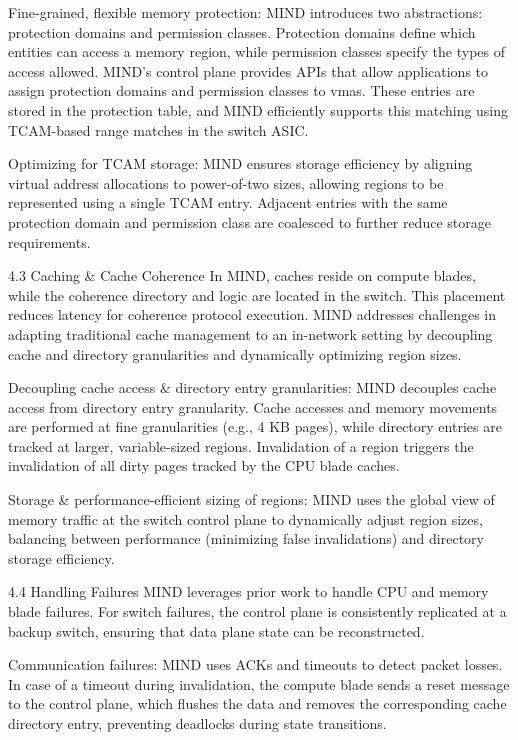 Fine-grained, flexible memory protection: MIND introduces two abstractions: protection domains and permission classes. Protection domains define which entities can access a memory region, while permission classes specify the types of access allowed. MIND’s control plane provides APIs that allow applications to assign protection domains and permission classes to vmas. These entries are stored in the protection table, and MIND efficiently supports this matching using TCAM-based range matches in the switch ASIC.

Optimizing for TCAM storage: MIND ensures storage efficiency by aligning virtual address allocations to power-of-two sizes, allowing regions to be represented using a single TCAM entry. Adjacent entries with the same protection domain and permission class are coalesced to further reduce storage requirements.

4.3 Caching \& Cache Coherence
In MIND, caches reside on compute blades, while the coherence directory and logic are located in the switch. This placement reduces latency for coherence protocol execution. MIND addresses challenges in adapting traditional cache management to an in-network setting by decoupling cache and directory granularities and dynamically optimizing region sizes.

Decoupling cache access \& directory entry granularities: MIND decouples cache access from directory entry granularity. Cache accesses and memory movements are performed at fine granularities (e.g., 4 KB pages), while directory entries are tracked at larger, variable-sized regions. Invalidation of a region triggers the invalidation of all dirty pages tracked by the CPU blade caches.

Storage \& performance-efficient sizing of regions: MIND uses the global view of memory traffic at the switch control plane to dynamically adjust region sizes, balancing between performance (minimizing false invalidations) and directory storage efficiency.

4.4 Handling Failures
MIND leverages prior work to handle CPU and memory blade failures. For switch failures, the control plane is consistently replicated at a backup switch, ensuring that data plane state can be reconstructed.

Communication failures: MIND uses ACKs and timeouts to detect packet losses. In case of a timeout during invalidation, the compute blade sends a reset message to the control plane, which flushes the data and removes the corresponding cache directory entry, preventing deadlocks during state transitions.


